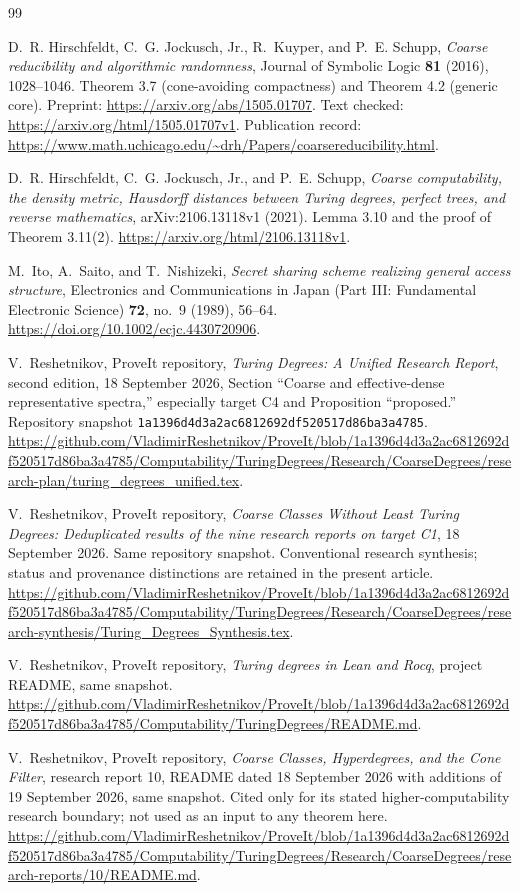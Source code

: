 \documentclass[11pt,letterpaper]{article}
\theoremstyle{plain}
\theoremstyle{definition}
\theoremstyle{remark}
\numberwithin{equation}{section}
\begin{document}
\begin{thebibliography}{99}

D.~R. Hirschfeldt, C.~G. Jockusch, Jr., R.~Kuyper, and P.~E. Schupp,
\emph{Coarse reducibility and algorithmic randomness},
Journal of Symbolic Logic \textbf{81} (2016), 1028--1046.
Theorem 3.7 (cone-avoiding compactness) and Theorem 4.2 (generic core).
Preprint: \url{https://arxiv.org/abs/1505.01707}.
Text checked: \url{https://arxiv.org/html/1505.01707v1}.
Publication record: \url{https://www.math.uchicago.edu/~drh/Papers/coarsereducibility.html}.

D.~R. Hirschfeldt, C.~G. Jockusch, Jr., and P.~E. Schupp,
\emph{Coarse computability, the density metric, Hausdorff distances between
Turing degrees, perfect trees, and reverse mathematics},
arXiv:2106.13118v1 (2021).
Lemma 3.10 and the proof of Theorem 3.11(2).
\url{https://arxiv.org/html/2106.13118v1}.

M.~Ito, A.~Saito, and T.~Nishizeki,
\emph{Secret sharing scheme realizing general access structure},
Electronics and Communications in Japan (Part III: Fundamental Electronic
Science) \textbf{72}, no.~9 (1989), 56--64.
\url{https://doi.org/10.1002/ecjc.4430720906}.

V.~Reshetnikov, ProveIt repository,
\emph{Turing Degrees: A Unified Research Report}, second edition,
18 September 2026, Section ``Coarse and effective-dense representative
spectra,'' especially target C4 and Proposition ``proposed.''
Repository snapshot
\texttt{1a1396d4d3a2ac6812692df520517d86ba3a4785}.
\url{https://github.com/VladimirReshetnikov/ProveIt/blob/1a1396d4d3a2ac6812692df520517d86ba3a4785/Computability/TuringDegrees/Research/CoarseDegrees/research-plan/turing_degrees_unified.tex}.

V.~Reshetnikov, ProveIt repository,
\emph{Coarse Classes Without Least Turing Degrees: Deduplicated results of
the nine research reports on target C1}, 18 September 2026.
Same repository snapshot. Conventional research synthesis; status and
provenance distinctions are retained in the present article.
\url{https://github.com/VladimirReshetnikov/ProveIt/blob/1a1396d4d3a2ac6812692df520517d86ba3a4785/Computability/TuringDegrees/Research/CoarseDegrees/research-synthesis/Turing_Degrees_Synthesis.tex}.

V.~Reshetnikov, ProveIt repository,
\emph{Turing degrees in Lean and Rocq}, project README, same snapshot.
\url{https://github.com/VladimirReshetnikov/ProveIt/blob/1a1396d4d3a2ac6812692df520517d86ba3a4785/Computability/TuringDegrees/README.md}.

V.~Reshetnikov, ProveIt repository,
\emph{Coarse Classes, Hyperdegrees, and the Cone Filter}, research report 10,
README dated 18 September 2026 with additions of 19 September 2026,
same snapshot. Cited only for its stated higher-computability research
boundary; not used as an input to any theorem here.
\url{https://github.com/VladimirReshetnikov/ProveIt/blob/1a1396d4d3a2ac6812692df520517d86ba3a4785/Computability/TuringDegrees/Research/CoarseDegrees/research-reports/10/README.md}.

\end{thebibliography}
\end{document}
